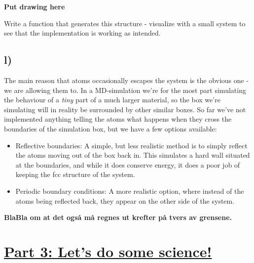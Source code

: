 \documentclass[11pt,british,a4paper]{report}
\begin{document}
\textbf{Put drawing here}

Write a function that generates this structure - visualize with a small system to see that the implementation is working as intended.

\subsection*{l)}

The main reason that atoms occasionally escapes the system is the obvious one - we are allowing them to. In a MD-simulation we're for the most part simulating the behaviour of a \textit{tiny}
part of a much larger material, so the box we're simulating will in reality be surrounded by other similar boxes. So far we've not implemented anything telling the atoms what happens when they cross
the boundaries of the simulation box, but we have a few options available:

\begin{itemize}
 \item Reflective boundaries: A simple, but less realistic method is to simply reflect the atoms moving out of the box back in. This simulates a hard wall situated at the boundaries,
 and while it does conserve energy, it does a poor job of keeping the fcc structure of the system.
 \item Periodic boundary conditions: A more realistic option, where instead of the atoms being reflected back, they appear on the other side of the system.
\end{itemize}

\textbf{BlaBla om at det også må regnes ut krefter på tvers av grensene.}




\section*{\underline{Part 3: Let's do some science!}}

\nocite{*}
\printbibliography{}
\end{document}
